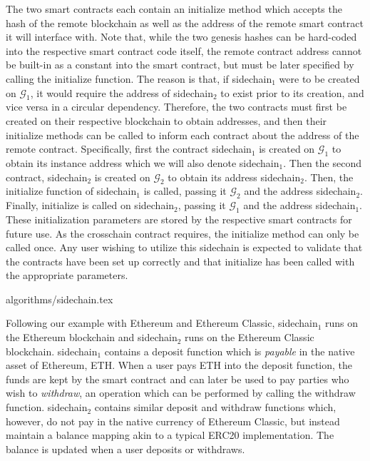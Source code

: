 The two smart contracts each contain an \textsf{initialize} method which accepts
the hash of the remote blockchain as well as the address of the remote smart
contract it will interface with. Note that, while the two genesis hashes can be
hard-coded into the respective smart contract code itself, the remote contract
address cannot be built-in as a constant into the smart contract, but must be
later specified by calling the \textsf{initialize} function. The reason is that,
if \textsf{sidechain}$_1$ were to be created on $\mathcal{G}_1$, it would
require the address of \textsf{sidechain}$_2$ to exist prior to its creation,
and vice versa in a circular dependency. Therefore, the two contracts must first
be created on their respective blockchain to obtain addresses, and then their
\textsf{initialize} methods can be called to inform each contract about the
address of the remote contract. Specifically, first the contract
\textsf{sidechain}$_1$ is created on $\mathcal{G}_1$ to obtain its instance
address which we will also denote \textsf{sidechain}$_1$. Then the second
contract, \textsf{sidechain}$_2$ is created on $\mathcal{G}_2$ to obtain its
address \textsf{sidechain}$_2$. Then, the \textsf{initialize} function of
\textsf{sidechain}$_1$ is called, passing it $\mathcal{G}_2$ and the address
\textsf{sidechain}$_2$. Finally, \textsf{initialize} is called on
\textsf{sidechain}$_2$, passing it $\mathcal{G}_1$ and the address
\textsf{sidechain}$_1$. These initialization parameters are stored by the
respective smart contracts for future use. As the \textsf{crosschain} contract
requires, the \textsf{initialize} method can only be called once. Any user
wishing to utilize this sidechain is expected to validate that the contracts
have been set up correctly and that \textsf{initialize} has been called with the
appropriate parameters.

{algorithms/sidechain.tex}

Following our example with Ethereum and Ethereum Classic, \textsf{sidechain}$_1$
runs on the Ethereum blockchain and \textsf{sidechain}$_2$ runs on the Ethereum
Classic blockchain. \textsf{sidechain}$_1$ contains a \textsf{deposit} function
which is \emph{payable} in the native asset of Ethereum, ETH. When a user pays
ETH into the \textsf{deposit} function, the funds are kept by the smart contract
and can later be used to pay parties who wish to \emph{withdraw}, an operation
which can be performed by calling the \textsf{withdraw} function.
\textsf{sidechain}$_2$ contains similar \textsf{deposit} and \textsf{withdraw}
functions which, however, do not pay in the native currency of Ethereum Classic,
but instead maintain a \textsf{balance} mapping akin to a typical ERC20
implementation. The balance is updated when a user deposits or withdraws.

